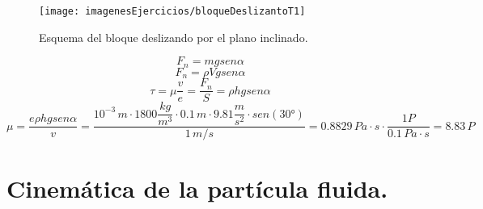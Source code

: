 \begin{enumerate}
\begin{figure}[H]
		\centering
		\texttt{[image: imagenesEjercicios/bloqueDeslizantoT1]}
		\caption{Esquema del bloque deslizando por el plano inclinado.}
		\label{fig:bloquedeslizantot1}
	\end{figure}
	\blue
	\[F_n=m g sen\alpha\]
	\[F_n=\rho V g sen\alpha\]
	\[\tau=\mu\dfrac{v}{e}=\dfrac{F_n}{S}=\rho h g sen\alpha\]
	\[
	\mu=
	\dfrac{e\rho h g sen\alpha}{v} =
	\dfrac{10^{-3}\,m\cdot1800\dfrac{kg}{m^3}\cdot0.1\,m\cdot 9.81 \dfrac{m}{s^2} \cdot sen(\ang{30})} {1\,m/s} = 
	0.8829\,Pa\cdot s\cdot\dfrac{1 P}{0.1\,Pa \cdot s}=8.83\,P
	\]
	\black
\end{enumerate}
\newpage

\section{Cinemática de la partícula fluida.}
